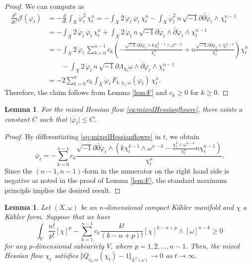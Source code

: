\documentclass[10pt,a4paper]{amsart}
\numberwithin{equation}{section}
\newtheorem{lem}[equation]{Lemma}
\newcommand{\delb}{\sqrt{-1}\partial\bar{\partial}}
\begin{document}
\begin{proof}
    We can compute as
    \begin{align*}
        \frac{d^2}{dt^2}\mathcal{J}(\varphi_t)
        &= - \frac{d}{dt} \int_X \dot{\varphi}_t^2 \, \chi_t^n
        = - \int_X 2 \, \dot{\varphi}_t \, \ddot{\varphi_t} \, \chi^n_t 
          - \int_X \dot{\varphi}_t^2 \, n \, \delb \dot{\varphi_t}  \wedge \chi^{n-1}_t \\
        &= - \int_X 2 \, \dot{\varphi}_t \, \ddot{\varphi_t} \, \chi^n_t 
           + \int_X 2 \, \dot{\varphi}_t \, n \, \sqrt{-1} \partial \dot{\varphi}_t\wedge \bar{\partial} \dot{\varphi}_t \wedge \chi^{n-1}_t \\
        &= - \int_X 2\, \dot{\varphi}_t \, \sum_{k=0}^{n-1}c_k\left(-\frac{\delb \dot{\varphi_t}\wedge k\chi_t^{k-1}\wedge\omega^{n-k}}{\chi^n_t}+n\frac{\delb\dot{\varphi_t}\wedge\chi_t^{n-1}}{\chi_t^n}\right)\chi^n_t\\
        &\qquad- \int_X 2 \, \dot{\varphi}_t \, n \, \sqrt{-1} \partial \Lambda_{\chi_t} \omega \wedge \bar{\partial} \dot{\varphi}_t \wedge \chi^{n-1}_t \\
        &= -2 \sum_{k=0}^n c_k\int_X \dot{\varphi}_t \, F_{k,\chi_t,\omega}(\dot{\varphi}_t) \, \chi^n_t.
    \end{align*}
    Therefore, the claim follows from Lemma \ref{lem:F} and $c_k\ge0$ for $k\ge0$.
\end{proof}

\begin{lem}\label{lem:bound}
    For the mixed Hessian flow \eqref{eq:mixedHessianflowre}, there exists a constant $C$ such that
    $\vert\dot{\varphi_t}\vert\le C$.
\end{lem}

\begin{proof}
    By differentiating \eqref{eq:mixedHessianflowre} in $t$, we obtain
    $$\ddot{\varphi_t}=-\sum_{k=0}^{n-1}c_k\frac{\delb\dot{\varphi_t}\wedge \left(k\chi_t^{k-1}\wedge\omega^{n-k}-\frac{\chi_t^k\wedge\omega^{n-k}}{\chi_t^n}n\chi_t^{n-1}\right)}{\chi_t^n}.$$
    Since the $(n-1,n-1)$-form in the numerator on the right hand side is negative as noted in the proof of Lemma \ref{lem:F}, the standard maximum principle implies the desired result.
\end{proof}

\begin{lem}\label{lem:conv}
    Let $(X,\omega)$ be an $n$-dimensional compact Kähler manifold and $\chi$ a Kähler form. Suppose that we have
    $$\int_V\frac{n!}{p!}[\chi]^p-\sum_{k=1}^{n-1}c_k\frac{k!}{(k-n+p)!}[\chi]^{k-n+p}\wedge[\omega]^{n-k}\ge0$$
    for any $p$-dimensional subvariety $V$, where $p=1,2,\dots,{n-1}$. Then, the mixed Hessian flow $\chi_t$ satisfies $\Vert Q_{c_0,\omega}(\chi_t)-1 \Vert_{L^2(\omega)}\to0$ as $t\to\infty$.
\end{lem}
\end{document}
